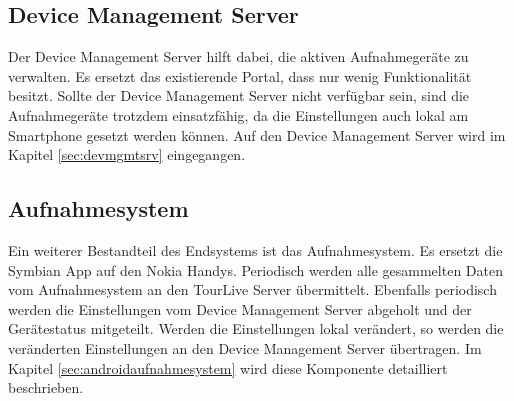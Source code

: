 \subsection{Device Management Server}
Der Device Management Server hilft dabei, die aktiven Aufnahmegeräte zu verwalten. Es ersetzt das existierende Portal, dass nur wenig Funktionalität besitzt. Sollte der Device Management Server nicht verfügbar sein, sind die Aufnahmegeräte trotzdem einsatzfähig, da die Einstellungen auch lokal am Smartphone gesetzt werden können. Auf den Device Management Server wird im Kapitel \ref{sec:devmgmtsrv} eingegangen.

\subsection{Aufnahmesystem}
Ein weiterer Bestandteil des Endsystems ist das Aufnahmesystem. Es ersetzt die Symbian App auf den Nokia Handys. Periodisch werden alle gesammelten Daten vom Aufnahmesystem an den TourLive Server übermittelt. Ebenfalls periodisch werden die Einstellungen vom Device Management Server abgeholt und der Gerätestatus mitgeteilt. Werden die Einstellungen lokal verändert, so werden die veränderten Einstellungen an den Device Management Server übertragen. Im Kapitel \ref{sec:androidaufnahmesystem} wird diese Komponente detailliert beschrieben.